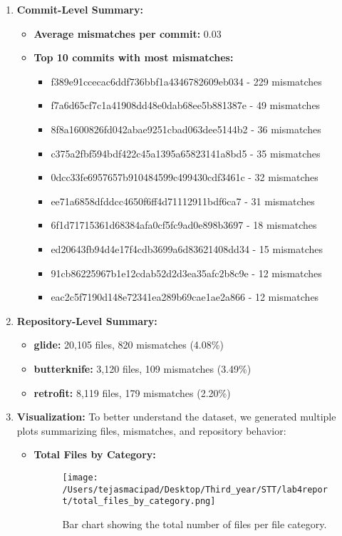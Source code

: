 \documentclass[12pt,a4paper]{article}
\begin{document}
\begin{enumerate}
    \item \textbf{Commit-Level Summary:}  
        \begin{itemize}
            \item \textbf{Average mismatches per commit:} 0.03  
            \item \textbf{Top 10 commits with most mismatches:}  
            \begin{itemize}
                \item f389e91ccecac6ddf736bbf1a4346782609eb034 - 229 mismatches  
                \item f7a6d65cf7c1a41908dd48e0dab68ee5b881387e - 49 mismatches  
                \item 8f8a1600826fd042abae9251cbad063dee5144b2 - 36 mismatches  
                \item c375a2fbf594bdf422c45a1395a65823141a8bd5 - 35 mismatches  
                \item 0dcc33fe6957657b910484599c499430cdf3461c - 32 mismatches  
                \item ee71a6858dfddcc4650f6ff4d71112911bdf6ca7 - 31 mismatches  
                \item 6f1d71715361d68384afa0cf5fc9ad0e898b3697 - 18 mismatches  
                \item ed20643fb94d4e17f4cdb3699a6d83621408dd34 - 15 mismatches  
                \item 91cb86225967b1e12cdab52d2d3ea35afc2b8c9e - 12 mismatches  
                \item eac2c5f7190d148e72341ea289b69cae1ae2a866 - 12 mismatches  
            \end{itemize}
        \end{itemize}
    \item \textbf{Repository-Level Summary:}  
        \begin{itemize}
            \item \textbf{glide:} 20,105 files, 820 mismatches (4.08\%)  
            \item \textbf{butterknife:} 3,120 files, 109 mismatches (3.49\%)  
            \item \textbf{retrofit:} 8,119 files, 179 mismatches (2.20\%)  
        \end{itemize}

    \item \textbf{Visualization:}  
        To better understand the dataset, we generated multiple plots summarizing files, mismatches, and repository behavior:
        \begin{itemize}
            \item \textbf{Total Files by Category:}  
            \begin{figure}[!h]
                \centering
                \texttt{[image: /Users/tejasmacipad/Desktop/Third\_year/STT/lab4report/total\_files\_by\_category.png]}
                \caption{Bar chart showing the total number of files per file category.}
            \end{figure}


\end{itemize}
\end{enumerate}
\end{document}
